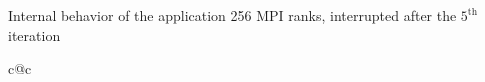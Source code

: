 \documentclass[10pt]{beamer}
\begin{document}
\begin{frame}[fragile]{Internal behavior of the application}
    256 MPI ranks, interrupted after the $5^{\text{th}}$ iteration\medskip

    \newcommand{\ganttcaption}[2]{\rotatebox{90}{\hspace{.6cm}$\text{#1}\atop \text{#2}$\hspace{-1cm}}}%
    \begin{overlayarea}{\linewidth}{7cm}
        \begin{tabular}{c@{}c}
            \only<+->{\ganttcaption{\hspace{.3cm}Reality}{}          & \includegraphics[width=.93\linewidth]{img/prediction/validation/traces/gantt_reality.png} \\}%
            \only<+>{\ganttcaption{Simple kernel}{Simple network}    & \includegraphics[width=.93\linewidth]{img/prediction/validation/traces/gantt_simulation_deterministic-CPU_linear-DGEMM_deterministic-network.png}\\}%
            \only<+>{\ganttcaption{Simple kernel}{Complex network}   & \includegraphics[width=.93\linewidth]{img/prediction/validation/traces/gantt_simulation_deterministic-CPU_linear-DGEMM_stochastic-network.png}\\}%

\end{tabular}
\end{overlayarea}
\end{frame}
\end{document}
